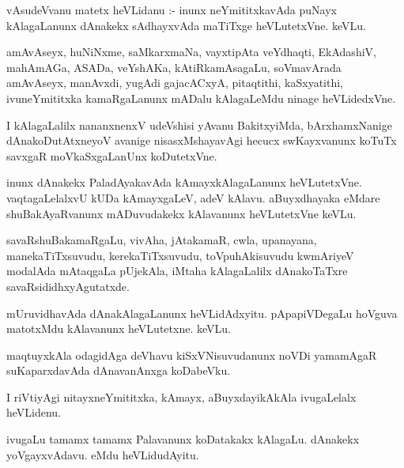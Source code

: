\documentclass{article}
\begin{document}
\begin{mn}
vAsudeVvanu matetx heVLidanu :- inunx neYmititxkavAda puNayx kAlagaLanunx dAnakekx 
sAdhayxvAda maTiTxge heVLutetxVne.  keVLu.
\end{mn}

\begin{mn}
amAvAseyx, huNiNxme, saMkarxmaNa, vayxtipAta  veYdhaqti, EkAdashiV, mahAmAGa, ASADa, 
veYshAKa, kAtiRkamAsagaLu, soVmavArada amAvAseyx, manAvxdi,  yugAdi gajacACxyA,  
pitaqtithi,  kaSxyatithi, ivuneYmititxka kamaRgaLanunx mADalu kAlagaLeMdu ninage heVLidedxVne.
\end{mn}

\begin{mn}
I kAlagaLalilx nananxnenxV udeVshisi yAvanu BakitxyiMda, bArxhamxNanige dAnakoDutAtxneyoV 
avanige nisasxMshayavAgi hecucx swKayxvanunx koTuTx savxgaR moVkaSxgaLanUnx  koDutetxVne.
\end{mn}

\begin{mn}
inunx dAnakekx PaladAyakavAda kAmayxkAlagaLanunx heVLutetxVne.  vaqtagaLelalxvU kUDa kAmayxgaLeV, 
adeV kAlavu.  aBuyxdhayaka eMdare shuBakAyaRvanunx mADuvudakekx  kAlavanunx heVLutetxVne keVLu.
\end{mn}

\begin{mn}
savaRshuBakamaRgaLu, vivAha, jAtakamaR,  cwla, upanayana,  manekaTiTxsuvudu,  kerekaTiTxsuvudu, 
toVpuhAkisuvudu kwmAriyeV modalAda mAtaqgaLa pUjekAla, iMtaha kAlagaLalilx dAnakoTaTxre savaRsididhxyAgutatxde.
\end{mn}

\begin{mn}
mUruvidhavAda dAnakAlagaLanunx heVLidAdxyitu.  pApapiVDegaLu  hoVguva matotxMdu kAlavanunx heVLutetxne.  keVLu. 
\end{mn}

\begin{mn}
maqtuyxkAla odagidAga deVhavu kiSxVNisuvudanunx  noVDi yamamAgaR suKaparxdavAda dAnavanAnxga koDabeVku.
\end{mn}

\begin{mn}
I riVtiyAgi  nitayxneYmititxka, kAmayx,  aBuyxdayikAkAla  ivugaLelalx heVLidenu.
\end{mn}

\begin{mn}
ivugaLu tamamx tamamx Palavanunx  koDatakakx kAlagaLu.  dAnakekx yoVgayxvAdavu.  eMdu heVLidudAyitu.
\end{mn}
\end{document}
